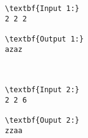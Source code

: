 \begin{verbatim}
\textbf{Input 1:}
2 2 2

\textbf{Output 1:}
azaz



\textbf{Input 2:}
2 2 6

\textbf{Ouput 2:}
zzaa
\end{verbatim}